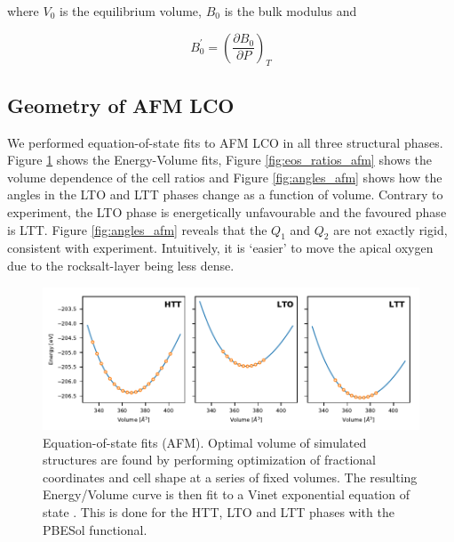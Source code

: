 \noindent where $V_0$ is the equilibrium volume, $B_0$ is the bulk modulus and 

\begin{equation*}
B_0^\prime = \left( \frac{\partial B_0}{\partial P}\right)_T
\end{equation*}

\subsection{Geometry of AFM LCO}
We performed equation-of-state fits to AFM LCO in all three structural phases. Figure \ref{fig:eos_afm_all} shows the Energy-Volume fits, Figure \ref{fig:eos_ratios_afm} shows the volume dependence of the cell ratios and Figure \ref{fig:angles_afm} shows how the angles in the LTO and LTT phases change as a function of volume. Contrary to experiment, the LTO phase is energetically unfavourable and the favoured phase is LTT. Figure \ref{fig:angles_afm} reveals that the $Q_1$ and $Q_2$ are not exactly rigid, consistent with experiment. Intuitively, it is `easier' to move the apical oxygen due to the rocksalt-layer being less dense.


\begin{figure}
    \centering
    \includegraphics[width=\textwidth]{fig/simulation/eos_all.pdf}
    \caption[AFM: Equation-of-state fits]{Equation-of-state fits (AFM). Optimal volume of simulated structures are found by performing optimization of fractional coordinates and cell shape at a series of fixed volumes. The resulting Energy/Volume curve is then fit to a Vinet exponential equation of state \cite{Vinet1987}. This is done for the HTT, LTO and LTT phases with the PBESol functional.}
    \label{fig:eos_afm_all}
\end{figure}

